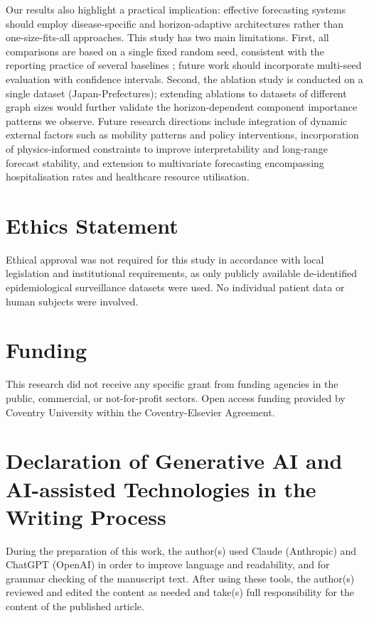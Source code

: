 \documentclass[a4paper,fleqn]{cas-dc}
\begin{document}
Our results also highlight a practical implication: effective forecasting systems should employ disease-specific and horizon-adaptive architectures rather than one-size-fits-all approaches. This study has two main limitations. First, all comparisons are based on a single fixed random seed, consistent with the reporting practice of several baselines \cite{li2017diffusion, lai2018modeling, xie2022epignn}; future work should incorporate multi-seed evaluation with confidence intervals. Second, the ablation study is conducted on a single dataset (Japan-Prefectures); extending ablations to datasets of different graph sizes would further validate the horizon-dependent component importance patterns we observe. Future research directions include integration of dynamic external factors such as mobility patterns and policy interventions, incorporation of physics-informed constraints to improve interpretability and long-range forecast stability, and extension to multivariate forecasting encompassing hospitalisation rates and healthcare resource utilisation.

\section*{Ethics Statement}

Ethical approval was not required for this study in accordance with local legislation and institutional requirements, as only publicly available de-identified epidemiological surveillance datasets were used. No individual patient data or human subjects were involved.

\section*{Funding}

This research did not receive any specific grant from funding agencies in the public, commercial, or not-for-profit sectors. Open access funding provided by Coventry University within the Coventry-Elsevier Agreement.

\section*{Declaration of Generative AI and AI-assisted Technologies in the Writing Process}

During the preparation of this work, the author(s) used Claude (Anthropic) and ChatGPT (OpenAI) in order to improve language and readability, and for grammar checking of the manuscript text. After using these tools, the author(s) reviewed and edited the content as needed and take(s) full responsibility for the content of the published article.
\end{document}
